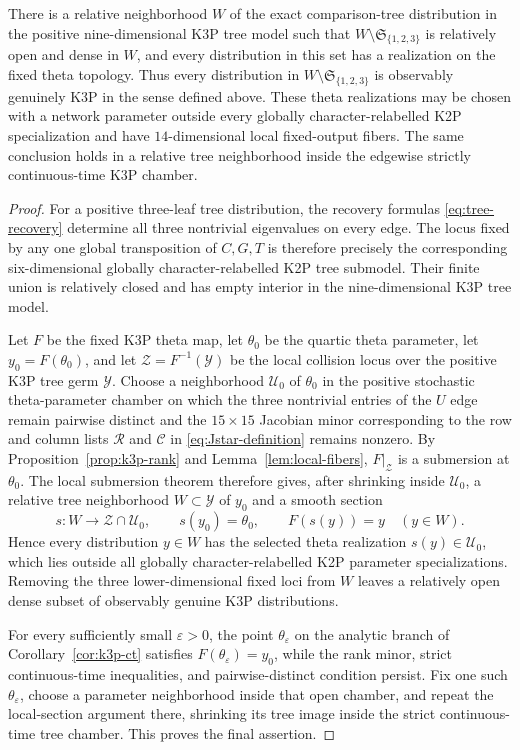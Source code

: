 \documentclass[11pt]{article}
\theoremstyle{remark}\newtheorem{remark}[theorem]{Remark}
\begin{document}
\begin{corollary}\label{cor:genuine-k3p-nearby}
There is a relative neighborhood $W$ of the exact comparison-tree distribution in the positive nine-dimensional K3P tree model such that $W\setminus\mathfrak S_{\{1,2,3\}}$ is relatively open and dense in $W$, and every distribution in this set has a realization on the fixed theta topology. Thus every distribution in $W\setminus\mathfrak S_{\{1,2,3\}}$ is observably genuinely K3P in the sense defined above. These theta realizations may be chosen with a network parameter outside every globally character-relabelled K2P specialization and have $14$-dimensional local fixed-output fibers. The same conclusion holds in a relative tree neighborhood inside the edgewise strictly continuous-time K3P chamber.
\end{corollary}
\begin{proof}
For a positive three-leaf tree distribution, the recovery formulas \eqref{eq:tree-recovery} determine all three nontrivial eigenvalues on every edge. The locus fixed by any one global transposition of $C,G,T$ is therefore precisely the corresponding six-dimensional globally character-relabelled K2P tree submodel. Their finite union is relatively closed and has empty interior in the nine-dimensional K3P tree model.

Let $F$ be the fixed K3P theta map, let $\theta_0$ be the quartic theta parameter, let $y_0=F(\theta_0)$, and let $\mathcal Z=F^{-1}(\mathcal Y)$ be the local collision locus over the positive K3P tree germ $\mathcal Y$. Choose a neighborhood $\mathcal U_0$ of $\theta_0$ in the positive stochastic theta-parameter chamber on which the three nontrivial entries of the $U$ edge remain pairwise distinct and the $15\times15$ Jacobian minor corresponding to the row and column lists $\mathcal R$ and $\mathcal C$ in \eqref{eq:Jstar-definition} remains nonzero. By Proposition~\ref{prop:k3p-rank} and Lemma~\ref{lem:local-fibers}, $F|_{\mathcal Z}$ is a submersion at $\theta_0$. The local submersion theorem therefore gives, after shrinking inside $\mathcal U_0$, a relative tree neighborhood $W\subset\mathcal Y$ of $y_0$ and a smooth section
\[
s:W\longrightarrow \mathcal Z\cap\mathcal U_0,
\qquad s(y_0)=\theta_0,
\qquad F(s(y))=y\quad(y\in W).
\]
Hence every distribution $y\in W$ has the selected theta realization $s(y)\in\mathcal U_0$, which lies outside all globally character-relabelled K2P parameter specializations. Removing the three lower-dimensional fixed loci from $W$ leaves a relatively open dense subset of observably genuine K3P distributions.

For every sufficiently small $\varepsilon>0$, the point $\theta_\varepsilon$ on the analytic branch of Corollary~\ref{cor:k3p-ct} satisfies $F(\theta_\varepsilon)=y_0$, while the rank minor, strict continuous-time inequalities, and pairwise-distinct condition persist. Fix one such $\theta_\varepsilon$, choose a parameter neighborhood inside that open chamber, and repeat the local-section argument there, shrinking its tree image inside the strict continuous-time tree chamber. This proves the final assertion.
\end{proof}
\end{document}
